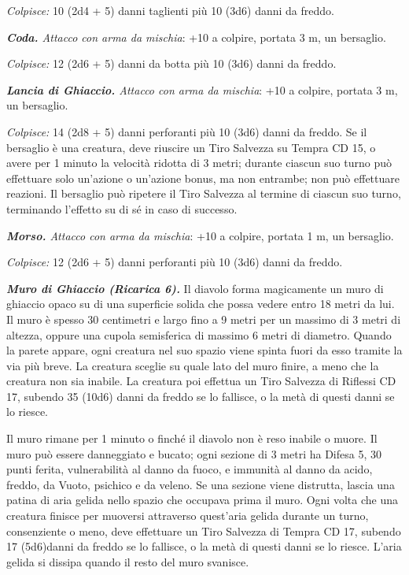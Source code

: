 \begin{multicols}{2}
\emph{Colpisce:} 10 (2d4 + 5) danni taglienti più 10 (3d6) danni da freddo.

\emph{\textbf{Coda.} Attacco con arma da mischia}: +10 a colpire, portata 3 m, un bersaglio.

\emph{Colpisce:} 12 (2d6 + 5) danni da botta più 10 (3d6) danni da freddo.

\emph{\textbf{Lancia di Ghiaccio.} Attacco con arma da mischia}: +10 a colpire, portata 3 m, un bersaglio.

\emph{Colpisce:} 14 (2d8 + 5) danni perforanti più 10 (3d6) danni da freddo. Se il bersaglio è una creatura, deve riuscire un Tiro Salvezza su Tempra CD 15, o avere per 1 minuto la velocità ridotta di 3 metri; durante ciascun suo turno può effettuare solo un'azione o un'azione bonus, ma non entrambe; non può effettuare reazioni. Il bersaglio può ripetere il Tiro Salvezza al termine di ciascun suo turno, terminando l'effetto su di sé in caso di successo.

\emph{\textbf{Morso.} Attacco con arma da mischia}: +10 a colpire,
portata 1 m, un bersaglio.

\emph{Colpisce:} 12 (2d6 + 5) danni perforanti più 10 (3d6) danni da
freddo.

\emph{\textbf{Muro di Ghiaccio (Ricarica 6).}} Il diavolo forma magicamente un muro di ghiaccio opaco su di una superficie solida che possa vedere entro 18 metri da lui. Il muro è spesso 30 centimetri e largo fino a 9 metri per un massimo di 3 metri di altezza, oppure   una cupola semisferica di massimo 6 metri di diametro. Quando la   parete appare, ogni creatura nel suo spazio viene spinta fuori da esso   tramite la via più breve. La creatura sceglie su quale lato del muro   finire, a meno che la creatura non sia inabile. La creatura poi   effettua un Tiro Salvezza di Riflessi CD 17, subendo 35 (10d6) danni da freddo se lo fallisce, o la metà di questi danni se lo riesce.

Il muro rimane per 1 minuto o finché il diavolo non è reso inabile o muore. Il muro può essere danneggiato e bucato; ogni sezione di 3 metri ha Difesa 5, 30 punti ferita, vulnerabilità al danno da fuoco, e immunità al danno da acido, freddo, da Vuoto, psichico e da veleno. Se una sezione viene distrutta, lascia una patina di aria gelida nello spazio che occupava prima il muro. Ogni volta che una creatura finisce per muoversi attraverso quest'aria gelida durante un turno, consenziente o meno, deve effettuare un Tiro Salvezza di Tempra CD 17, subendo 17 (5d6)danni da freddo se lo  fallisce, o la metà di questi danni se lo riesce. L'aria gelida si dissipa quando il resto del muro svanisce.



\end{multicols}
